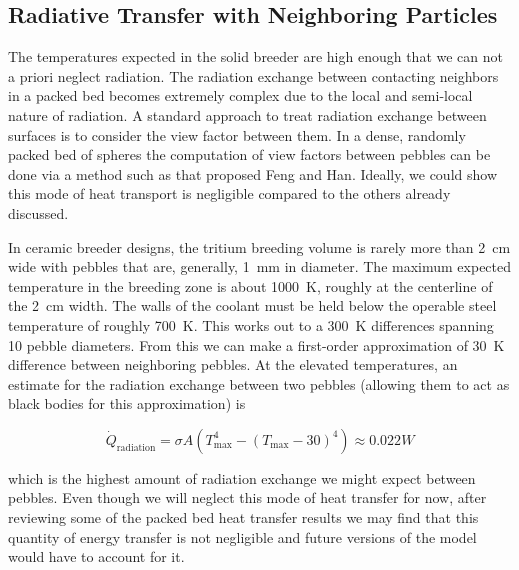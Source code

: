 \subsection{Radiative Transfer with Neighboring Particles}

The temperatures expected in the solid breeder are high enough that we can not a priori neglect radiation. The radiation exchange between contacting neighbors in a packed bed becomes extremely complex due to the local and semi-local nature of radiation. A standard approach to treat radiation exchange between surfaces is to consider the view factor between them. In a dense, randomly packed bed of spheres the computation of view factors between pebbles can be done via a method such as that proposed Feng and Han\cite{Feng2012}. Ideally, we could show this mode of heat transport is negligible compared to the others already discussed.

In ceramic breeder designs, the tritium breeding volume is rarely more than \SI{2}{\centi\meter} wide with pebbles that are, generally, \SI{1}{\milli\meter} in diameter. The maximum expected temperature in the breeding zone is about \si{1000 K}, roughly at the centerline of the \SI{2}{\centi\meter} width. The walls of the coolant must be held below the operable steel temperature of roughly \SI{700}{\kelvin}. This works out to a \SI{300}{\kelvin} differences spanning 10 pebble diameters. From this we can make a first-order approximation of \SI{30}{\kelvin} difference between neighboring pebbles. At the elevated temperatures, an estimate for the radiation exchange between two pebbles (allowing them to act as black bodies for this approximation) is

\begin{equation}
	\dot{Q}_\text{radiation} = \sigma A \left(T_\text{max}^4 - (T_\text{max}-30)^4\right) \approx 0.022\si{W}
\end{equation}
 
 which is the highest amount of radiation exchange we might expect between pebbles. Even though we will neglect this mode of heat transfer for now, after reviewing some of the packed bed heat transfer results we may find that this quantity of energy transfer is not negligible and future versions of the model would have to account for it.
